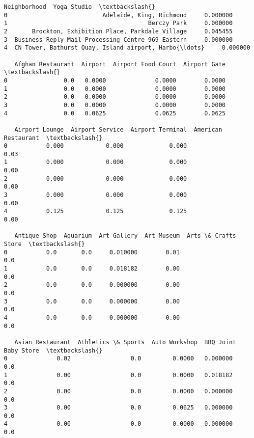 \documentclass[11pt]{article}
\makeatletter
\newcommand{\boxspacing}{\kern\kvtcb@left@rule\kern\kvtcb@boxsep}
\newcommand{\prompt}[4]{
        \ttfamily\llap{{\color{#2}[#3]:\hspace{3pt}#4}}\vspace{-\baselineskip}
    }
\makeatother
\begin{document}
            \begin{tcolorbox}[breakable, size=fbox, boxrule=.5pt, pad at break*=1mm, opacityfill=0]
\prompt{Out}{outcolor}{98}{\boxspacing}
\begin{Verbatim}[commandchars=\\\{\}]
                                        Neighborhood  Yoga Studio  \textbackslash{}
0                           Adelaide, King, Richmond     0.000000
1                                        Berczy Park     0.000000
2       Brockton, Exhibition Place, Parkdale Village     0.045455
3  Business Reply Mail Processing Centre 969 Eastern     0.000000
4  CN Tower, Bathurst Quay, Island airport, Harbo{\ldots}     0.000000

   Afghan Restaurant  Airport  Airport Food Court  Airport Gate  \textbackslash{}
0                0.0   0.0000              0.0000        0.0000
1                0.0   0.0000              0.0000        0.0000
2                0.0   0.0000              0.0000        0.0000
3                0.0   0.0000              0.0000        0.0000
4                0.0   0.0625              0.0625        0.0625

   Airport Lounge  Airport Service  Airport Terminal  American Restaurant  \textbackslash{}
0           0.000            0.000             0.000                 0.03
1           0.000            0.000             0.000                 0.00
2           0.000            0.000             0.000                 0.00
3           0.000            0.000             0.000                 0.00
4           0.125            0.125             0.125                 0.00

   Antique Shop  Aquarium  Art Gallery  Art Museum  Arts \& Crafts Store  \textbackslash{}
0           0.0       0.0     0.010000        0.01                  0.0
1           0.0       0.0     0.018182        0.00                  0.0
2           0.0       0.0     0.000000        0.00                  0.0
3           0.0       0.0     0.000000        0.00                  0.0
4           0.0       0.0     0.000000        0.00                  0.0

   Asian Restaurant  Athletics \& Sports  Auto Workshop  BBQ Joint  Baby Store  \textbackslash{}
0              0.02                 0.0         0.0000   0.000000         0.0
1              0.00                 0.0         0.0000   0.018182         0.0
2              0.00                 0.0         0.0000   0.000000         0.0
3              0.00                 0.0         0.0625   0.000000         0.0
4              0.00                 0.0         0.0000   0.000000         0.0


\end{Verbatim}
\end{tcolorbox}
\end{document}
